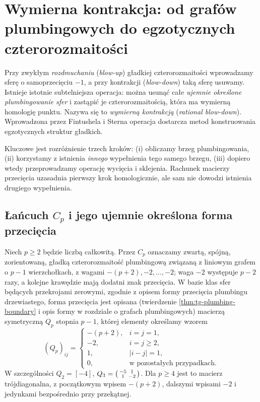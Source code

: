 \chapter{Wymierna kontrakcja: od grafów plumbingowych do egzotycznych czterorozmaitości}
\label{ch:tg-rational-blowdown}

Przy zwykłym \emph{rozdmuchaniu} (\emph{blow-up}) gładkiej
czterorozmaitości wprowadzamy sferę o samoprzecięciu $-1$,
a przy kontrakcji (\emph{blow-down}) taką sferę usuwamy.
Istnieje istotnie subtelniejsza operacja: można usunąć całe
\emph{ujemnie określone plumbingowanie sfer} i zastąpić je
czterorozmaitością, która ma wymierną homologię punktu.
Nazywa się to \emph{wymierną kontrakcją} (\emph{rational
blow-down}). Wprowadzona przez Fintushela i Sterna operacja
dostarcza metod konstruowania egzotycznych struktur gładkich.

Kluczowe jest rozróżnienie trzech kroków: (i) obliczamy brzeg
plumbingowania, (ii) korzystamy z istnienia \emph{innego}
wypełnienia tego samego brzegu, (iii) dopiero wtedy
przeprowadzamy operację wycięcia i sklejenia. Rachunek
macierzy przecięcia uzasadnia pierwszy krok homologicznie,
ale sam nie dowodzi istnienia drugiego wypełnienia.

\section{Łańcuch \texorpdfstring{$C_p$}{Cp} i jego ujemnie określona forma przecięcia}
\label{sec:tg-rb-config}

\begin{definicja}
Niech $p\geq2$ będzie liczbą całkowitą.
Przez $C_p$ oznaczamy zwartą, spójną, zorientowaną,
gładką czterorozmaitość plumbingową związaną z liniowym
grafem o $p-1$ wierzchołkach, z wagami
$-(p+2),-2,\ldots,-2$; waga $-2$ występuje
$p-2$ razy, a kolejne krawędzie mają dodatni znak
przecięcia. W bazie klas sfer będących przekrojami zerowymi,
zgodnie z opisem formy przecięcia plumbingu drzewiastego,
forma przecięcia jest opisana (twierdzenie
\ref{thm:tg-plumbing-boundary} i opis formy w rozdziale
o grafach plumbingowych)
macierzą symetryczną $Q_p$ stopnia $p-1$, której elementy
określamy wzorem
\[
(Q_p)_{ij}=\begin{cases}
-(p+2),&i=j=1,\\
-2,&i=j\geq2,\\
1,&|i-j|=1,\\
0,&\text{w pozostałych przypadkach}.
\end{cases}
\]
W szczególności $Q_2=[-4]$,
$Q_3=\begin{psmallmatrix}-5&1\\1&-2\end{psmallmatrix}$.
Dla $p\geq4$ jest to macierz trójdiagonalna,
z początkowym wpisem $-(p+2)$, dalszymi wpisami
$-2$ i jedynkami bezpośrednio przy przekątnej.
\end{definicja}

